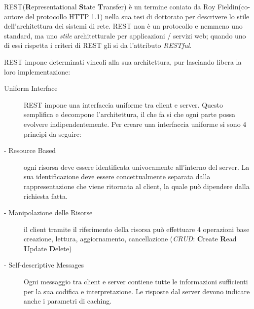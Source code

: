REST(\textbf{R}epresentational \textbf{S}tate \textbf{T}ransfer) è un termine coniato da Roy Fieldin(co-autore del protocollo HTTP 1.1) nella sua tesi di dottorato per descrivere lo stile dell'architettura dei sistemi di rete. REST non è un protocollo e nemmeno uno standard, ma uno \emph{stile} architetturale per applicazioni / servizi web; quando uno di essi rispetta i criteri di REST gli si da l'attributo \emph{RESTful}.

REST impone determinati vincoli alla sua architettura, pur lasciando libera la loro implementazione:

\begin{description}

\item[Uniform Interface] 

REST impone una interfaccia uniforme tra client e server. Questo semplifica e decompone l'architettura, il che fa si che ogni parte possa evolvere indipendentemente. Per creare una interfaccia uniforme si sono 4 principi da seguire:

\item[- Resource Based] 

ogni risorsa deve essere identificata univocamente all'interno del server. La sua identificazione deve essere concettualmente separata dalla rappresentazione che viene ritornata al client, la quale può dipendere dalla richiesta fatta.

\item[- Manipolazione delle Risorse] 

il client tramite il riferimento della risorsa può effettuare 4 operazioni base creazione, lettura, aggiornamento, cancellazione (\emph{CRUD}: \textbf{C}reate \textbf{R}ead \textbf{U}pdate \textbf{D}elete)

\item[- Self-descriptive Messages] 

Ogni messaggio tra client e server contiene tutte le informazioni sufficienti per la sua codifica e interpretazione. Le risposte dal server devono indicare anche i parametri di caching.


\end{description}
